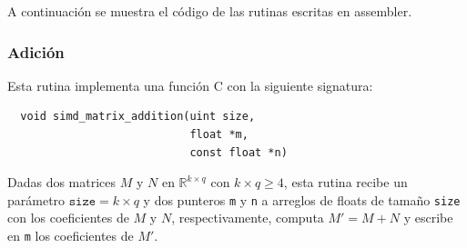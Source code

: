 \documentclass[a4paper, 10pt, twoside]{article}
\newcommand{\cc}[1]{\texttt{#1}}
\begin{document}
A continuación se muestra el código de las rutinas escritas en assembler.


\subsubsection{Adición}

Esta rutina implementa una función C con la siguiente signatura:

\begin{verbatim}
  void simd_matrix_addition(uint size,
                            float *m,
                            const float *n)
\end{verbatim}

Dadas dos matrices $M$ y $N$ en $\mathbb{R}^{k \times q}$ con $k \times q \geq
4$, esta rutina recibe un parámetro $\cc{size} = k \times q$ y dos punteros
\cc{m} y \cc{n} a arreglos de floats de tamaño \cc{size} con los coeficientes
de $M$ y $N$, respectivamente, computa $M' = M + N$ y escribe en \cc{m} los
coeficientes de $M'$.
\end{document}
